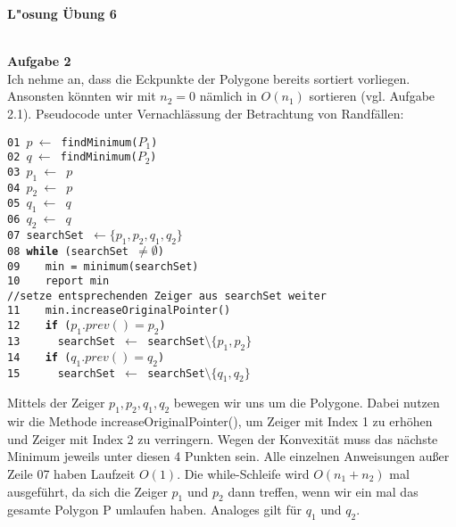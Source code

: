 \documentclass{article}
\newcommand{\serie}{6}
\begin{document}
\begin{large}
\textbf{L"osung \"Ubung \serie}\\ \\
\end{large}
\textbf{Aufgabe 2}\\
Ich nehme an, dass die Eckpunkte der Polygone bereits sortiert vorliegen. Ansonsten k\"onnten wir mit $n_2=0$ n\"amlich in $O(n_1)$ sortieren (vgl. Aufgabe 2.1).
Pseudocode unter Vernachl\"assung der Betrachtung von Randf\"allen:

\begin{minipage}{.6\textwidth}
\texttt{01 $p\ \leftarrow$ findMinimum($P_1$)\\
02 $q\ \leftarrow$ findMinimum($P_2$)\\
03 $p_{1}\ \leftarrow$ $p$\\
04 $p_{2}\ \leftarrow$ $p$\\
05 $q_{1}\ \leftarrow$ $q$\\
06 $q_{2}\ \leftarrow$ $q$\\
07 searchSet $\leftarrow \{p_1,p_2,q_1,q_2\}$\\
08 {\bf while} (searchSet $\neq \emptyset$)\\
09 $\quad$ min = minimum(searchSet)\\
10 $\quad$ report min\\
//setze entsprechenden Zeiger aus searchSet weiter\\
11 $\quad$ min.increaseOriginalPointer()\\
12 $\quad$ {\bf if} ($p_1.prev() = p_2$)\\
13 $\quad\quad$ searchSet $\leftarrow$ searchSet$\setminus \{p_1,p_2\}$\\
14 $\quad$ {\bf if} ($q_1.prev() = q_2$)\\
15 $\quad\quad$ searchSet $\leftarrow$ searchSet$\setminus \{q_1,q_2\}$
}
\end{minipage}
\begin{minipage}{.4\textwidth}
Mittels der Zeiger $p_1,p_2,q_1,q_2$ bewegen wir uns um die Polygone. Dabei nutzen wir die Methode increaseOriginalPointer(), um Zeiger mit Index 1 zu erh\"ohen und Zeiger mit Index 2 zu verringern. Wegen der Konvexit\"at muss das n\"achste Minimum jeweils unter diesen 4 Punkten sein. Alle einzelnen Anweisungen au\ss er Zeile 07 haben Laufzeit $O(1)$. Die while-Schleife wird $O(n_1 + n_2)$ mal ausgef\"uhrt, da sich die Zeiger $p_1$ und $p_2$ dann treffen, wenn wir ein mal das gesamte Polygon P umlaufen haben. Analoges gilt f\"ur $q_1$ und $q_2$.
\end{minipage}
\end{document}
